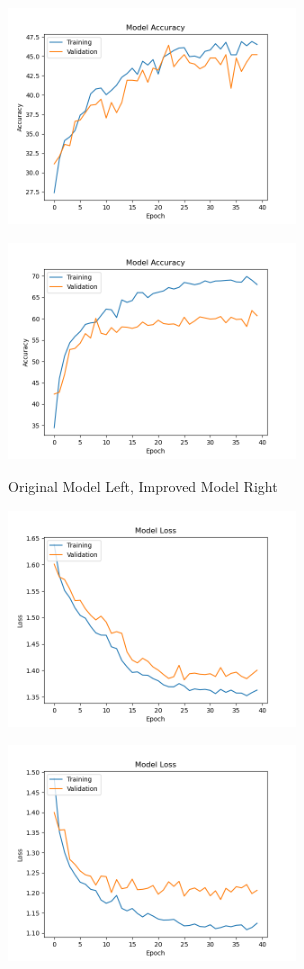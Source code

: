 \documentclass[12pt]{article}
\begin{document}
{\includegraphics[width = 3in]{images/MLP_accuracies}
{\includegraphics[width = 3in]{images/MLP_improved_accuracies}

\bigskip

Original Model Left, Improved Model Right

\bigskip

{\includegraphics[width = 3in]{images/MLP_losses}
{\includegraphics[width = 3in]{images/MLP_improved_losses}


}}}}
\end{document}
